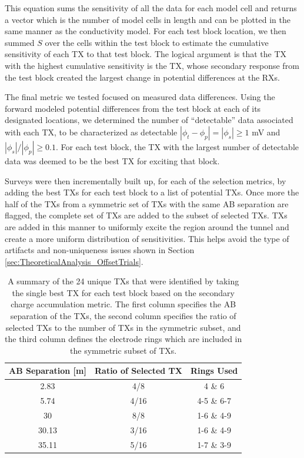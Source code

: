 \documentclass[preprint,authoryear,12pt]{elsarticle}
\begin{document}
This equation sums the sensitivity of all the data for each model cell and returns a vector which is the number of model cells in length and can be plotted in the same manner as the conductivity model. For each test block location, we then summed $S$ over the cells within the test block to estimate the cumulative sensitivity of each TX to that test block. The logical argument is that the TX with the highest cumulative sensitivity is the TX, whose secondary response from the test block created the largest change in potential differences at the RXs.

The final metric we tested focused on measured data differences. Using the forward modeled potential differences from the test block at each of its designated locations, we determined the number of ``detectable'' data associated with each TX, to be characterized as detectable $|\phi_t - \phi_p| = |\phi_s| \geq 1$ mV and  $|\phi_s|/|\phi_p| \geq 0.1$. For each test block, the TX with the largest number of detectable data was deemed to be the best TX for exciting that block.

Surveys were then incrementally built up, for each of the selection metrics, by adding the best TXs for each test block to a list of potential TXs. Once more the half of the TXs from a symmetric set of TXs with the same AB separation are flagged, the complete set of TXs are added to the subset of selected TXs. TXs are added in this manner to uniformly excite the region around the tunnel and create a more uniform distribution of sensitivities. This helps avoid the type of artifacts and non-uniqueness issues shown in Section \ref{sec:TheoreticalAnalysis_OffsetTrials}.


\begin{table} [htp]
   \footnotesize
   \begin{center}
      \begin{tabular}{| c | c | c |}
         \hline
         \textbf{AB Separation [m]} & \textbf{Ratio of Selected TX}  & \textbf{Rings Used} \\
         \hline
         2.83 & 4/8 & 4 \& 6\\
         \hline
         5.74 & 4/16 & 4-5 \& 6-7\\
         \hline
         30 & 8/8 & 1-6 \& 4-9\\
         \hline
         30.13 & 3/16 & 1-6 \& 4-9\\
         \hline
         35.11 & 5/16 & 1-7 \& 3-9\\
         \hline
      \end{tabular}
   \end{center}
\caption{A summary of the 24 unique TXs that were identified by taking the single best TX for each test block based on the secondary charge accumulation metric. The first column specifies the AB separation of the TXs, the second column specifies the ratio of selected TXs to the number of TXs in the symmetric subset, and the third column defines the electrode rings which are included in the symmetric subset of TXs.}
\label{table:SurveyDesign_Charge1TxPerBlk}
\end{table}
\end{document}
